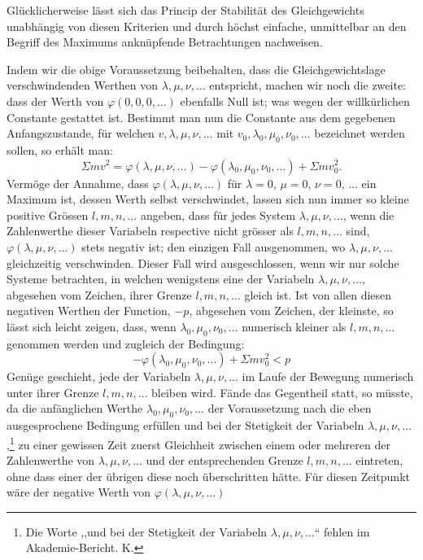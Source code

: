 \documentclass[11pt]{article}
\begin{document}
Glücklicherweise lässt sich das Princip der Stabilität des Gleichgewichts unabhängig von diesen Kriterien und durch höchst einfache, unmittelbar an den Begriff des Maximums anknüpfende Betrachtungen nachweisen.

Indem wir die obige Voraussetzung beibehalten, dass die Gleichgewichtslage verschwindenden Werthen von $\lambda,\mu,\nu,\ldots$ entspricht, machen wir noch die zweite: dass der Werth von $\varphi(0,0,0,\ldots)$ ebenfalls Null ist; was wegen der willkürlichen Constante gestattet ist. Bestimmt man nun die Constante aus dem gegebenen Anfangszustande, für welchen $v,\lambda,\mu,\nu,\ldots$ mit $v_0,\lambda_0,\mu_0,\nu_0,\ldots$ bezeichnet werden sollen, so erhält man:
\[
\Sigma m v^2 = \varphi(\lambda,\mu,\nu,\ldots)-\varphi(\lambda_0,\mu_0,\nu_0,\ldots)+\Sigma m v_0^2.
\]
Vermöge der Annahme, dass $\varphi(\lambda,\mu,\nu,\ldots)$ für $\lambda=0$, $\mu=0$, $\nu=0$, $\ldots$ ein Maximum ist, dessen Werth selbst verschwindet, lassen sich nun immer so kleine positive Grössen $l,m,n,\ldots$ angeben, dass für jedes System $\lambda,\mu,\nu,\ldots$, wenn die Zahlenwerthe dieser Variabeln respective nicht grösser als $l,m,n,\ldots$ sind, $\varphi(\lambda,\mu,\nu,\ldots)$ stets negativ ist; den einzigen Fall ausgenommen, wo $\lambda,\mu,\nu,\ldots$ gleichzeitig verschwinden. Dieser Fall wird ausgeschlossen, wenn wir nur solche Systeme betrachten, in welchen wenigstens eine der Variabeln $\lambda,\mu,\nu,\ldots$, abgesehen vom Zeichen, ihrer Grenze $l,m,n,\ldots$ gleich ist. Ist von allen diesen negativen Werthen der Function, $-p$, abgesehen vom Zeichen, der kleinste, so lässt sich leicht zeigen, dass, wenn $\lambda_0,\mu_0,\nu_0,\ldots$ numerisch kleiner als $l,m,n,\ldots$ genommen werden und zugleich der Bedingung:
\[
-\varphi(\lambda_0,\mu_0,\nu_0,\ldots)+\Sigma m v_0^2<p
\]
Genüge geschieht, jede der Variabeln $\lambda,\mu,\nu,\ldots$ im Laufe der Bewegung numerisch unter ihrer Grenze $l,m,n,\ldots$ bleiben wird. Fände das Gegentheil statt, so müsste, da die anfänglichen Werthe $\lambda_0,\mu_0,\nu_0,\ldots$ der Voraussetzung nach die eben ausgesprochene Bedingung erfüllen und bei der Stetigkeit der Variabeln $\lambda,\mu,\nu,\ldots$,\footnote{Die Worte ,,und bei der Stetigkeit der Variabeln $\lambda,\mu,\nu,\ldots$`` fehlen im Akademie-Bericht. K.} zu einer gewissen Zeit zuerst Gleichheit zwischen einem oder mehreren der Zahlenwerthe von $\lambda,\mu,\nu,\ldots$ und der entsprechenden Grenze $l,m,n,\ldots$ eintreten, ohne dass einer der übrigen diese noch überschritten hätte. Für diesen Zeitpunkt wäre der negative Werth von $\varphi(\lambda,\mu,\nu,\ldots)$
\end{document}
